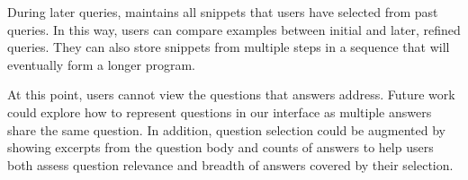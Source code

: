 During later queries, \systemname{} maintains all snippets that users have selected from past queries.
In this way, users can compare examples between initial and later, refined queries.
They can also store snippets from multiple steps in a sequence that will eventually form a longer program.

At this point, users cannot view the questions that answers address.
Future work could explore how to represent questions in our interface as multiple answers share the same question.
In addition, question selection could be augmented by showing excerpts from the question body and counts of answers to help users both assess question relevance and breadth of answers covered by their selection.